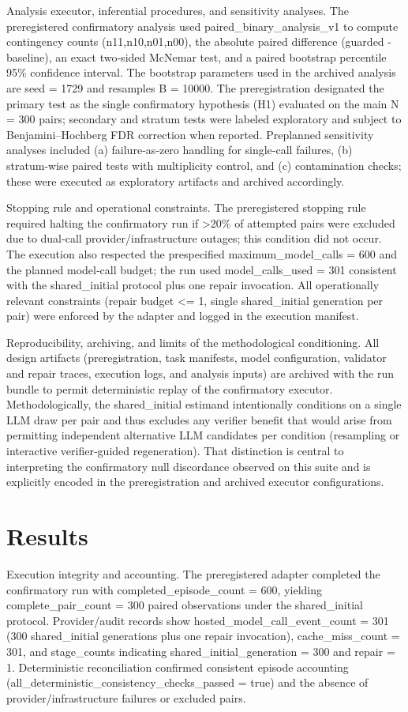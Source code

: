 \documentclass[conference]{IEEEtran}
\begin{document}
Analysis executor, inferential procedures, and sensitivity analyses. The preregistered confirmatory analysis used paired\_binary\_analysis\_v1 to compute contingency counts (n11,n10,n01,n00), the absolute paired difference (guarded - baseline), an exact two‑sided McNemar test, and a paired bootstrap percentile 95\% confidence interval. The bootstrap parameters used in the archived analysis are seed = 1729 and resamples B = 10000. The preregistration designated the primary test as the single confirmatory hypothesis (H1) evaluated on the main N = 300 pairs; secondary and stratum tests were labeled exploratory and subject to Benjamini--Hochberg FDR correction when reported. Preplanned sensitivity analyses included (a) failure‑as‑zero handling for single‑call failures, (b) stratum‑wise paired tests with multiplicity control, and (c) contamination checks; these were executed as exploratory artifacts and archived accordingly.

Stopping rule and operational constraints. The preregistered stopping rule required halting the confirmatory run if >20\% of attempted pairs were excluded due to dual‑call provider/infrastructure outages; this condition did not occur. The execution also respected the prespecified maximum\_model\_calls = 600 and the planned model‑call budget; the run used model\_calls\_used = 301 consistent with the shared\_initial protocol plus one repair invocation. All operationally relevant constraints (repair budget <= 1, single shared\_initial generation per pair) were enforced by the adapter and logged in the execution manifest.

Reproducibility, archiving, and limits of the methodological conditioning. All design artifacts (preregistration, task manifests, model configuration, validator and repair traces, execution logs, and analysis inputs) are archived with the run bundle to permit deterministic replay of the confirmatory executor. Methodologically, the shared\_initial estimand intentionally conditions on a single LLM draw per pair and thus excludes any verifier benefit that would arise from permitting independent alternative LLM candidates per condition (resampling or interactive verifier‑guided regeneration). That distinction is central to interpreting the confirmatory null discordance observed on this suite and is explicitly encoded in the preregistration and archived executor configurations.

\section{Results}
Execution integrity and accounting. The preregistered adapter completed the confirmatory run with completed\_episode\_count = 600, yielding complete\_pair\_count = 300 paired observations under the shared\_initial protocol. Provider/audit records show hosted\_model\_call\_event\_count = 301 (300 shared\_initial generations plus one repair invocation), cache\_miss\_count = 301, and stage\_counts indicating shared\_initial\_generation = 300 and repair = 1. Deterministic reconciliation confirmed consistent episode accounting (all\_deterministic\_consistency\_checks\_passed = true) and the absence of provider/infrastructure failures or excluded pairs.
\end{document}
